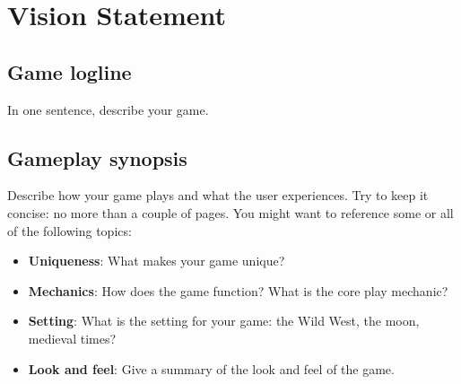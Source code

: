\chapter{Vision Statement}

\section{Game logline}%
In one sentence, describe your game.

\section{Gameplay synopsis}%
Describe how your game plays and what the user experiences. Try to keep it concise: no more than a couple of pages. You might want to reference some or all of the following topics:
\begin{itemize}
    \item \textbf{Uniqueness}: What makes your game unique?
    \item \textbf{Mechanics}: How does the game function? What is the core play mechanic?
    \item \textbf{Setting}: What is the setting for your game: the Wild West, the moon, medieval times?
    \item \textbf{Look and feel}: Give a summary of the look and feel of the game.
\end{itemize}
        
